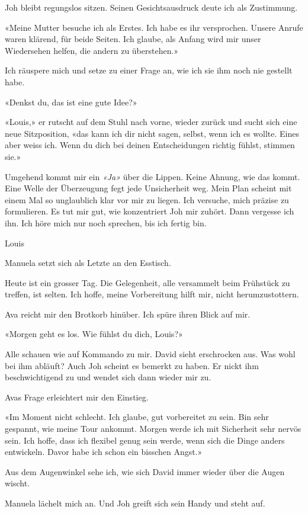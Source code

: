 Joh bleibt regungslos sitzen. Seinen Gesichtsausdruck deute ich als
Zustimmung.

«Meine Mutter besuche ich als Erstes. Ich habe es ihr versprochen.
Unsere Anrufe waren klärend, für beide Seiten. Ich glaube, als Anfang
wird mir unser Wiedersehen helfen, die andern zu überstehen.»

Ich räuspere mich und setze zu einer Frage an, wie ich sie ihm noch nie
gestellt habe.

«Denkst du, das ist eine gute Idee?»

«Louis,» er rutscht auf dem Stuhl nach vorne, wieder zurück und sucht
sich eine neue Sitzposition, «das kann ich dir nicht sagen, selbst, wenn
ich es wollte. Eines aber weiss ich. Wenn du dich bei deinen
Entscheidungen richtig fühlst, stimmen sie.»

Umgehend kommt mir ein \emph{«Ja»} über die Lippen. Keine Ahnung, wie
das kommt. Eine Welle der Überzeugung fegt jede Unsicherheit weg. Mein
Plan scheint mit einem Mal so unglaublich klar vor mir zu liegen. Ich
versuche, mich präzise zu formulieren. Es tut mir gut, wie konzentriert
Joh mir zuhört. Dann vergesse ich ihn. Ich höre mich nur noch sprechen,
bis ich fertig bin.

Louis

Manuela setzt sich als Letzte an den Esstisch.

Heute ist ein grosser Tag. Die Gelegenheit, alle versammelt beim
Frühstück zu treffen, ist selten. Ich hoffe, meine Vorbereitung hilft
mir, nicht herumzustottern.

Ava reicht mir den Brotkorb hinüber. Ich spüre ihren Blick auf mir.

«Morgen geht es los. Wie fühlst du dich, Louis?»

Alle schauen wie auf Kommando zu mir. David sieht erschrocken aus. Was
wohl bei ihm abläuft? Auch Joh scheint es bemerkt zu haben. Er nickt ihm
beschwichtigend zu und wendet sich dann wieder mir zu.

Avas Frage erleichtert mir den Einstieg.

«Im Moment nicht schlecht. Ich glaube, gut vorbereitet zu sein. Bin sehr
gespannt, wie meine Tour ankommt. Morgen werde ich mit Sicherheit sehr
nervös sein. Ich hoffe, dass ich flexibel genug sein werde, wenn sich
die Dinge anders entwickeln. Davor habe ich schon ein bisschen Angst.»

Aus dem Augenwinkel sehe ich, wie sich David immer wieder über die Augen
wischt.

Manuela lächelt mich an. Und Joh greift sich sein Handy und steht auf.


